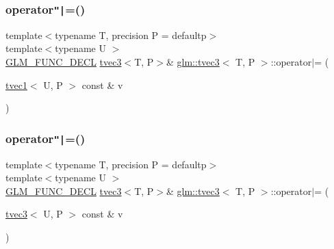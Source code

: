 \mbox{\label{structglm_1_1tvec3_a2fe619296352d6a5298b63b3d118bbeb}} 
\subsubsection{\texorpdfstring{operator\texttt{"|}=()}{operator|=()}\hspace{0.1cm}{\footnotesize\ttfamily [2/6]}}
{\footnotesize\ttfamily template$<$typename T, precision P = defaultp$>$ \\
template$<$typename U $>$ \\
\mbox{\hyperlink{setup_8hpp_ab2d052de21a70539923e9bcbf6e83a51}{G\+L\+M\+\_\+\+F\+U\+N\+C\+\_\+\+D\+E\+CL}} \mbox{\hyperlink{structglm_1_1tvec3}{tvec3}}$<$T, P$>$\& \mbox{\hyperlink{structglm_1_1tvec3}{glm\+::tvec3}}$<$ T, P $>$\+::operator$\vert$= (\begin{DoxyParamCaption}\item[{\mbox{\hyperlink{structglm_1_1tvec1}{tvec1}}$<$ U, P $>$ const \&}]{v }\end{DoxyParamCaption})}

\mbox{\label{structglm_1_1tvec3_a81a873ab5ca19d6bf3360a11f65d4f50}} 
\subsubsection{\texorpdfstring{operator\texttt{"|}=()}{operator|=()}\hspace{0.1cm}{\footnotesize\ttfamily [3/6]}}
{\footnotesize\ttfamily template$<$typename T, precision P = defaultp$>$ \\
template$<$typename U $>$ \\
\mbox{\hyperlink{setup_8hpp_ab2d052de21a70539923e9bcbf6e83a51}{G\+L\+M\+\_\+\+F\+U\+N\+C\+\_\+\+D\+E\+CL}} \mbox{\hyperlink{structglm_1_1tvec3}{tvec3}}$<$T, P$>$\& \mbox{\hyperlink{structglm_1_1tvec3}{glm\+::tvec3}}$<$ T, P $>$\+::operator$\vert$= (\begin{DoxyParamCaption}\item[{\mbox{\hyperlink{structglm_1_1tvec3}{tvec3}}$<$ U, P $>$ const \&}]{v }\end{DoxyParamCaption})}

